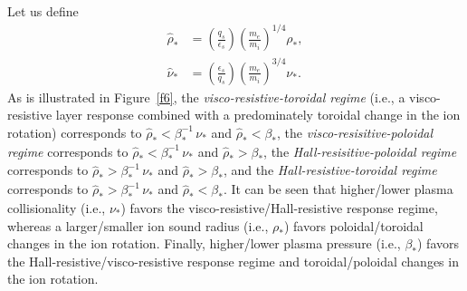 \documentclass[notitlepage,12pt]{article}
\begin{document}
Let us define 
\begin{align}
\hat{\rho}_\ast&= \left(\frac{q_s}{\epsilon_s}\right)\left(\frac{m_e}{m_i}\right)^{1/4}\rho_\ast,\\[0.5ex]
\hat{\nu}_\ast&=\left(\frac{\epsilon_s}{q_s}\right)\left(\frac{m_e}{m_i}\right)^{3/4}\nu_\ast.
\end{align}
As is illustrated in Figure~\ref{f6}, the {\em visco-resistive-toroidal regime}\/ (i.e., a visco-resistive layer response
combined with a predominately toroidal change in the ion rotation) corresponds to $\hat{\rho}_\ast < \beta_\ast^{-1}\,\nu_\ast$ 
and $\hat{\rho}_\ast <\beta_\ast$, the {\em visco-resisitive-poloidal regime}\/ corresponds to 
 $\hat{\rho}_\ast<\beta_\ast^{-1}\,\nu_\ast$ and $\hat{\rho}_\ast > \beta_\ast$, the {\em Hall-resisitive-poloidal regime}\/ corresponds to  
 $\hat{\rho}_\ast>\beta_\ast^{-1}\,\nu_\ast$ and $\hat{\rho}_\ast > \beta_\ast$, and the {\em Hall-resistive-toroidal regime}\/ corresponds to   
 $\hat{\rho}_\ast>\beta_\ast^{-1}\,\nu_\ast$ and $\hat{\rho}_\ast < \beta_\ast$.
It can be seen that higher/lower plasma collisionality (i.e., $\nu_\ast$) favors the visco-resistive/Hall-resistive response regime, whereas a
larger/smaller ion sound radius (i.e., $\rho_\ast$) favors poloidal/toroidal changes in the ion rotation. Finally, higher/lower plasma
pressure (i.e., $\beta_\ast$) 
favors the Hall-resistive/visco-resistive response regime and toroidal/poloidal changes in the ion rotation. 
\end{document}
